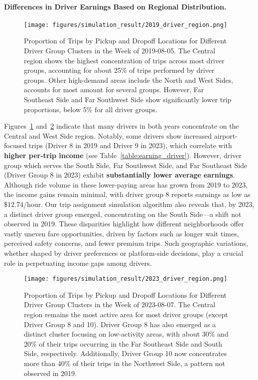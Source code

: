\paragraph{\textbf{Differences in Driver Earnings Based on Regional Distribution.}}
\begin{figure}[ht!]
  \centering
  \texttt{[image: figures/simulation\_result/2019\_driver\_region.png]}
\caption{Proportion of Trips by Pickup and Dropoff Locations for Different Driver Group Clusters in the Week of 2019-08-05. The Central region shows the highest concentration of trips across most driver groups, accounting for about 25\% of trips performed by driver groups. Other high-demand areas include the North and West Sides, accounts for most amount for several groups. However, Far Southeast Side and Far Southwest Side show significantly lower trip proportions, below 5\% for all driver groups.}
  \label{figure:dropoff_pickup_2019}
\end{figure}
Figures~\ref{figure:dropoff_pickup_2019} and~\ref{figure:dropoff_pickup_2023} indicate that many drivers in both years concentrate on the Central and West Side region. Notably, some drivers show increased airport-focused trips (Driver 8 in 2019 and Driver 9 in 2023), which correlate with \textbf{higher per-trip income} (see Table~\ref{table:earning_driver}). However, driver group which serves the South Side, Far Southwest Side, and Far Southeast Side (Driver Group 8 in 2023) exhibit \textbf{substantially lower average earnings}. Although ride volume in these lower-paying areas has grown from 2019 to 2023, the income gains remain minimal, with driver group 8 reports earnings as low as \$12.74/hour. Our trip assignment simulation algorithm also reveals that, by 2023, a distinct driver group emerged, concentrating on the South Side—a shift not observed in 2019. These disparities highlight how different neighborhoods offer vastly uneven fare opportunities, driven by factors such as longer wait times, perceived safety concerns, and fewer premium trips. Such geographic variations, whether shaped by driver preferences or platform-side decisions, play a crucial role in perpetuating income gaps among drivers.


\begin{figure}[H]
  \centering
  \texttt{[image: figures/simulation\_result/2023\_driver\_region.png]}
\caption{Proportion of Trips by Pickup and Dropoff Locations for Different Driver Group Clusters in the Week of 2023-08-07. The Central region remains the most active area for most driver groups (except Driver Group 8 and 10). Driver Group 8 has also emerged as a distinct cluster focusing on low-activity areas, with about 30\% and 20\% of their trips occurring in the Far Southeast Side and South Side, respectively. Additionally, Driver Group 10 now concentrates more than 40\% of their trips in the Northwest Side, a pattern not observed in 2019.}

  \label{figure:dropoff_pickup_2023}
\end{figure}


